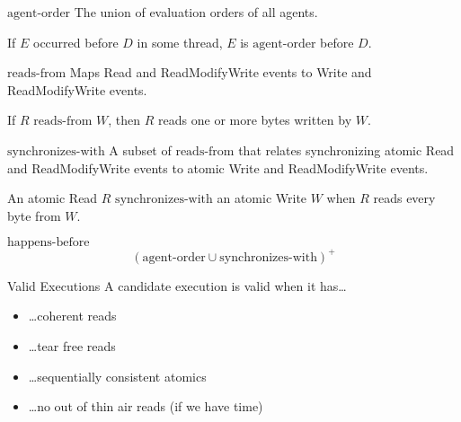 \documentclass{beamer}
\begin{document}
\begin{frame}{$\textrm{agent-order}$}
  The union of evaluation orders of all agents.

  \begin{center}
    If $E$ occurred before $D$ in some thread, $E$ is $\textrm{agent-order}$ before $D$.
  \end{center}
\end{frame}

\begin{frame}{$\textrm{reads-from}$}
  Maps Read and ReadModifyWrite events to Write and ReadModifyWrite events.

  \begin{center}
    If $R$ $\textrm{reads-from}$ $W$, then $R$ reads one or more bytes written by $W$.
  \end{center}
\end{frame}

\begin{frame}{$\textrm{synchronizes-with}$}
  A subset of $\textrm{reads-from}$ that relates synchronizing atomic Read and ReadModifyWrite events to atomic Write and ReadModifyWrite events.

  \begin{center}
    An atomic Read $R$ $\textrm{synchronizes-with}$ an atomic Write $W$ when $R$ reads every byte from $W$.
  \end{center}

\end{frame}

\begin{frame}{$\textrm{happens-before}$}
  $$(\textrm{agent-order} \cup \textrm{synchronizes-with})^{+}$$
\end{frame}

\begin{frame}{Valid Executions}
  A candidate execution is valid when it has\ldots

  \begin{itemize}
  \item \ldots coherent reads
  \item \ldots tear free reads
  \item \ldots sequentially consistent atomics
  \item \ldots no out of thin air reads (if we have time)
  \end{itemize}
\end{frame}
\end{document}
